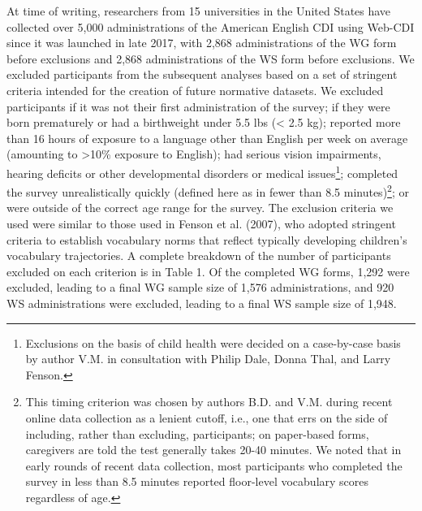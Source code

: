 \documentclass[
  english,
  ,man,floatsintext]{apa6}
\begin{document}
At time of writing, researchers from 15 universities in the United States have collected over 5,000 administrations of the American English CDI using Web-CDI since it was launched in late 2017, with 2,868 administrations of the WG form before exclusions and 2,868 administrations of the WS form before exclusions. We excluded participants from the subsequent analyses based on a set of stringent criteria intended for the creation of future normative datasets. We excluded participants if it was not their first administration of the survey; if they were born prematurely or had a birthweight under 5.5 lbs (\textless{} 2.5 kg); reported more than 16 hours of exposure to a language other than English per week on average (amounting to \textgreater10\% exposure to English); had serious vision impairments, hearing deficits or other developmental disorders or medical issues\footnote{Exclusions on the basis of child health were decided on a case-by-case basis by author V.M. in consultation with Philip Dale, Donna Thal, and Larry Fenson.}; completed the survey unrealistically quickly (defined here as in fewer than 8.5 minutes)\footnote{This timing criterion was chosen by authors B.D. and V.M. during recent online data collection as a lenient cutoff, i.e., one that errs on the side of including, rather than excluding, participants; on paper-based forms, caregivers are told the test generally takes 20-40 minutes. We noted that in early rounds of recent data collection, most participants who completed the survey in less than 8.5 minutes reported floor-level vocabulary scores regardless of age.}; or were outside of the correct age range for the survey. The exclusion criteria we used were similar to those used in Fenson et al. (2007), who adopted stringent criteria to establish vocabulary norms that reflect typically developing children's vocabulary trajectories. A complete breakdown of the number of participants excluded on each criterion is in Table 1. Of the completed WG forms, 1,292 were excluded, leading to a final WG sample size of 1,576 administrations, and 920 WS administrations were excluded, leading to a final WS sample size of 1,948.
\end{document}
